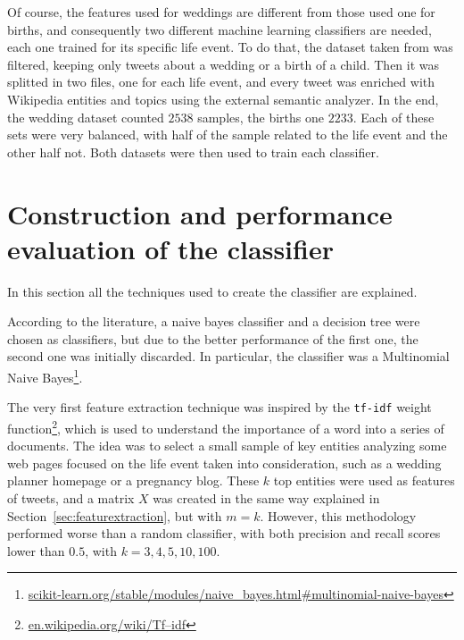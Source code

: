 Of course, the features used for weddings are different from those used one for births, and consequently two different machine learning classifiers are needed, each one trained for its specific life event. To do that, the dataset taken from \cite{dickinson2015identifying} was filtered, keeping only tweets about a wedding or a birth of a child. Then it was splitted in two files, one for each life event, and every tweet was enriched with Wikipedia entities and topics using the external semantic analyzer. In the end, the wedding dataset counted $2538$ samples, the births one $2233$. Each of these sets were very balanced, with half of the sample related to the life event and the other half not. Both datasets were then used to train each classifier.

\section{Construction and performance evaluation of the classifier}
In this section all the techniques used to create the classifier are explained.

 According to the literature, a naive bayes classifier and a decision tree were chosen as classifiers, but due to the better performance of the first one, the second one was initially discarded. In particular, the classifier was a Multinomial Naive Bayes\footnote{\url{scikit-learn.org/stable/modules/naive_bayes.html#multinomial-naive-bayes}}.

The very first feature extraction technique was inspired by the \texttt{tf-idf} weight function\footnote{\url{en.wikipedia.org/wiki/Tf–idf}}, which is used to understand the importance of a word into a series of documents. The idea was to select a small sample of key entities analyzing some web pages focused on the life event taken into consideration, such as a wedding planner homepage or a pregnancy blog. These $k$ top entities were used as features of tweets, and a matrix $X$ was created in the same way explained in Section~\ref{sec:featurextraction}, but with $m = k$. However, this methodology performed worse than a random classifier, with both precision and recall scores lower than $0.5$, with $k = 3, 4, 5, 10, 100$.


